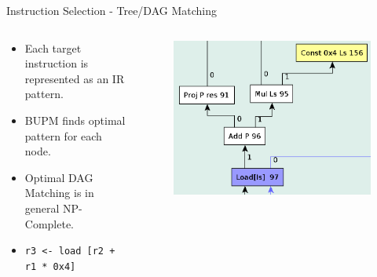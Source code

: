 \documentclass[en,16:9]{sdqbeamer}
\begin{document}
\begin{frame}{Instruction Selection - Tree/DAG Matching}
	\begin{columns}
		\begin{column}{0.5\textwidth}
			\begin{itemize}
				\item Each target instruction is represented as an IR pattern.
				\item BUPM finds optimal pattern for each node.
				\item Optimal DAG Matching is in general NP-Complete.
				\vspace{2em}
				\item \texttt{r3 <- load [r2 + r1 * 0x4]}
			\end{itemize}
		\end{column}

		\begin{column}{0.5\textwidth}
			\begin{figure}
				\centering
				\includegraphics[scale=0.3]{images/instruction-selection.png}
			\end{figure}
		\end{column}
	\end{columns}
\end{frame}
\end{document}
